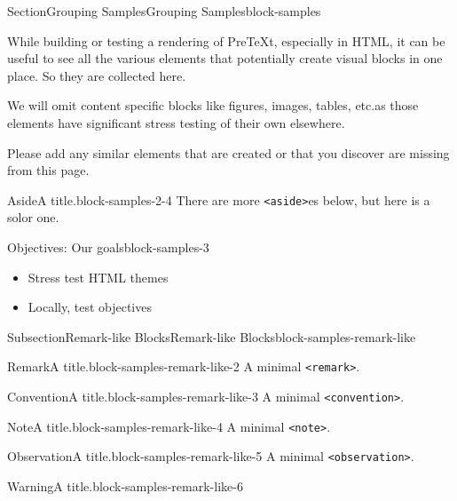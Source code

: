 \documentclass[twoside,10pt,]{article}
\newcommand{\mono}[1]{\texttt{#1}}
\numberwithin{equation}{section}
\begin{document}
%
\begin{sectionptx}{Section}{Grouping Samples}{}{Grouping Samples}{}{}{block-samples}
\begin{introduction}{}%
While building or testing a rendering of PreTeXt, especially in HTML, it can be useful to see all the various elements that potentially create visual blocks in one place. So they are collected here.%
\par
We will omit content specific blocks like figures, images, tables, etc.\@ as those elements have significant stress testing of their own elsewhere.%
\par
Please add any similar elements that are created or that you discover are missing from this page.%
\begin{aside}{Aside}{A title.}{block-samples-2-4}%
There are more \mono{<aside>}es below, but here is a solor one.%
\end{aside}
\end{introduction}%
\begin{objectives}{Objectives: Our goals}{block-samples-3}
%
\begin{itemize}[label=\textbullet]
\item{}Stress test HTML themes%
\item{}Locally, test objectives%
\end{itemize}
\end{objectives}
%
%
\typeout{************************************************}
\typeout{************************************************}
%
\begin{subsectionptx}{Subsection}{Remark-like Blocks}{}{Remark-like Blocks}{}{}{block-samples-remark-like}
\begin{remark}{Remark}{A title.}{block-samples-remark-like-2}%
A minimal \mono{<remark>}.%
\end{remark}
\begin{convention}{Convention}{A title.}{block-samples-remark-like-3}%
A minimal \mono{<convention>}.%
\end{convention}
\begin{note}{Note}{A title.}{block-samples-remark-like-4}%
A minimal \mono{<note>}.%
\end{note}
\begin{observation}{Observation}{A title.}{block-samples-remark-like-5}%
A minimal \mono{<observation>}.%
\end{observation}
\begin{warning}{Warning}{A title.}{block-samples-remark-like-6}%

\end{warning}
\end{subsectionptx}
\end{sectionptx}
\end{document}
